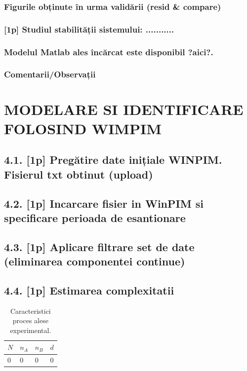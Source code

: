 \documentclass[12pt,english]{article}
\begin{document}
\subsubsection { Figurile obținute în urma validării (resid \& compare) }
\subsubsection { [1p] Studiul stabilității sistemului: ........... }
\subsubsection { Modelul Matlab ales încărcat este disponibil ?aici?. }
\subsubsection { Comentarii/Observații }

\section { MODELARE SI IDENTIFICARE FOLOSIND WIMPIM }
\subsection {4.1. [1p] Pregătire date inițiale WINPIM. Fisierul txt obtinut (upload) }
\subsection {4.2. [1p] Incarcare fisier in WinPIM si specificare perioada de esantionare }
\subsection {4.3. [1p] Aplicare filtrare set de date (eliminarea componentei continue) }
\subsection {4.4. [1p] Estimarea complexitatii}
\begin{table}[H]
  \centering
    \begin{tabular}{|l|l|l|l|}
      \hline
      $N$ & $n_A$ & $n_B$ & $d$ \\
      \hline
      0 & 0 & 0 & 0 \\
      \hline
    \end{tabular}
    \caption{Caracteristici proces alese experimental.}
\end{table}
\end{document}
